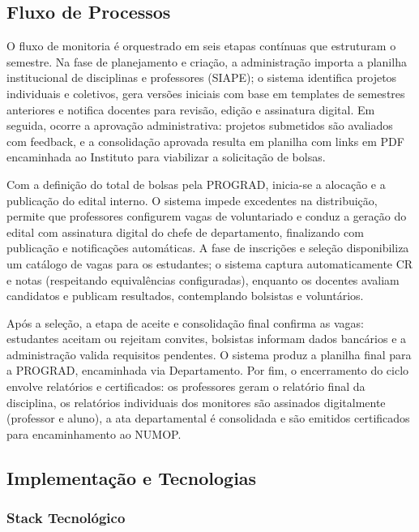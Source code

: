 \documentclass[portuguese]{sbc2025}%
\begin{document}
\subsection{Fluxo de Processos}

O fluxo de monitoria é orquestrado em seis etapas contínuas que estruturam o semestre. Na fase de planejamento e criação, a administração importa a planilha institucional de disciplinas e professores (SIAPE); o sistema identifica projetos individuais e coletivos, gera versões iniciais com base em templates de semestres anteriores e notifica docentes para revisão, edição e assinatura digital. Em seguida, ocorre a aprovação administrativa: projetos submetidos são avaliados com feedback, e a consolidação aprovada resulta em planilha com links em PDF encaminhada ao Instituto para viabilizar a solicitação de bolsas.

Com a definição do total de bolsas pela PROGRAD, inicia-se a alocação e a publicação do edital interno. O sistema impede excedentes na distribuição, permite que professores configurem vagas de voluntariado e conduz a geração do edital com assinatura digital do chefe de departamento, finalizando com publicação e notificações automáticas. A fase de inscrições e seleção disponibiliza um catálogo de vagas para os estudantes; o sistema captura automaticamente CR e notas (respeitando equivalências configuradas), enquanto os docentes avaliam candidatos e publicam resultados, contemplando bolsistas e voluntários.

Após a seleção, a etapa de aceite e consolidação final confirma as vagas: estudantes aceitam ou rejeitam convites, bolsistas informam dados bancários e a administração valida requisitos pendentes. O sistema produz a planilha final para a PROGRAD, encaminhada via Departamento. Por fim, o encerramento do ciclo envolve relatórios e certificados: os professores geram o relatório final da disciplina, os relatórios individuais dos monitores são assinados digitalmente (professor e aluno), a ata departamental é consolidada e são emitidos certificados para encaminhamento ao NUMOP.

\subsection{Implementação e Tecnologias}

\subsubsection{Stack Tecnológico}
\end{document}
